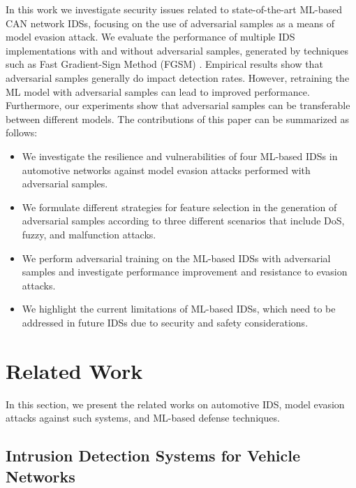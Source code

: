 \documentclass[conference]{IEEEtran}
\begin{document}
%

In this work we investigate security issues related to state-of-the-art ML-based CAN network IDSs, focusing on the use of adversarial samples as a means of model evasion attack.
We evaluate the performance of multiple IDS implementations with and without adversarial samples, generated by techniques such as Fast Gradient-Sign Method (FGSM) \cite{Explaining_Harnessing_Adversarial_Examples_2014}.
%
Empirical results show that adversarial samples generally do impact detection rates. However, retraining the ML model with adversarial samples can lead to improved performance. Furthermore, our experiments show that adversarial samples can be transferable between different models. The contributions of this paper can be summarized as follows:
\begin{itemize}
    \item We investigate the resilience and vulnerabilities of four ML-based IDSs in automotive networks against model evasion attacks performed with adversarial samples.
    \item We formulate different strategies for feature selection in the generation of adversarial samples according to three different scenarios that include DoS, fuzzy, and malfunction attacks.
    \item We perform adversarial training on the ML-based IDSs with adversarial samples and investigate performance improvement and resistance to evasion attacks.
    \item We highlight the current limitations of  ML-based IDSs, which need to be addressed in future IDSs due to security and safety considerations.
\end{itemize}
%


\section{Related Work}
\label{sec:relatedwork}

In this section, we present the related works on automotive IDS, model evasion attacks against such systems, and ML-based defense techniques.



\subsection{Intrusion Detection Systems for Vehicle Networks}
\end{document}
